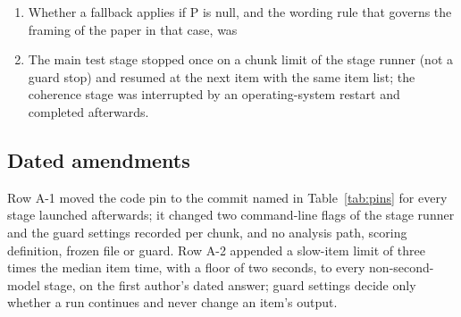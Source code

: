 \begin{enumerate}
with S2 partial is then possible.
\item Whether a fallback applies if P is null, and the wording rule that governs the framing of the paper in that case, was
\item The main test stage stopped once on a chunk limit of the stage runner (not a guard stop) and resumed at the next item with the same
item list; the coherence stage was interrupted by an operating-system restart and completed afterwards.
\end{enumerate}

\subsection{Dated amendments}\label{app:amend}
Row A-1 moved the code pin to the commit named in Table~\ref{tab:pins} for every stage launched afterwards; it changed two
command-line flags of the stage runner and the guard settings recorded per chunk, and no analysis path, scoring definition, frozen
file or guard.
Row A-2 appended a slow-item limit of three times the median item time, with a floor of two seconds, to every non-second-model
stage, on the first author's dated answer; guard settings decide only whether a run continues and never change an item's output.

